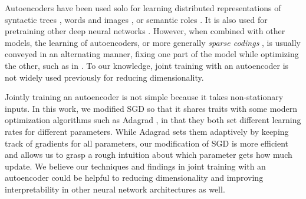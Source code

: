 \documentclass[11pt,a4paper]{article}
\begin{document}



Autoencoders have been used solo for learning distributed representations 
of syntactic trees \citep{socher-EtAl:2011:EMNLP}, words and 
images \citep{silberer-lapata:2014:P14-1}, 
or semantic roles \citep{titov-khoddam:2015:NAACL-HLT}. It is also used 
for pretraining other deep neural networks \citep{Erhan:2010:WUP}. 
However, when combined with other models, the learning of autoencoders, or more generally 
\emph{sparse codings} \citep{rubinstein2010dictionaries}, is 
usually conveyed in an alternating manner, %
fixing one part of the model while optimizing the other, 
such as in \citet{xie-EtAl:2017:Long}. 
To our knowledge, joint training with an autoencoder is not widely used previously 
for reducing dimensionality. 

Jointly training an autoencoder is not simple because it takes 
non-stationary inputs. 
In this work, we modified SGD so that it shares 
traits with some modern optimization algorithms such as Adagrad \citep{DBLP:journals/jmlr/DuchiHS11}, 
in that they both set different learning rates for different parameters. While 
Adagrad sets them adaptively by keeping track of gradients for 
all parameters, our modification of SGD is more efficient and allows us to 
grasp a rough intuition about which parameter gets how much update. 
We believe our techniques and findings in joint training with an autoencoder 
could be helpful to reducing dimensionality and improving interpretability in 
other neural network architectures as well. 
\end{document}
